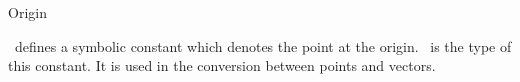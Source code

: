 \begin{ccRefClass}{Origin}

\ccDefinition
\cgal\ defines a symbolic constant
  which denotes the point at the origin.
\ccRefName\ is the type of this constant.
It is used in the conversion between points and vectors.

\ccSeeAlso
{} \\
 \\
 \\
 \\
 \\
 \\
\end{ccRefClass}
